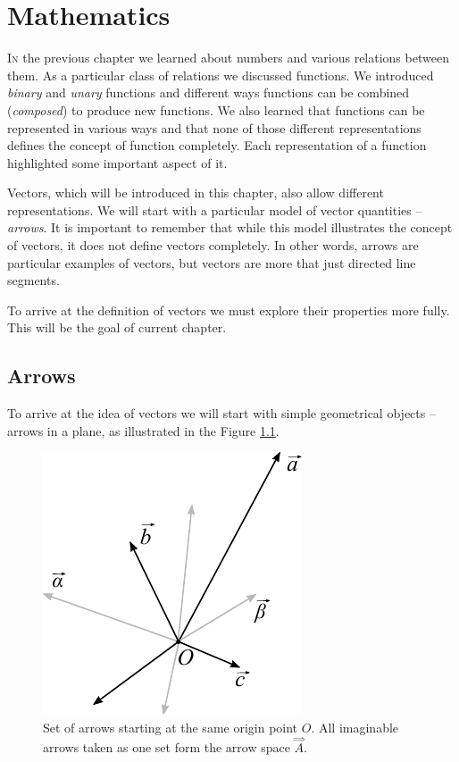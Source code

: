 \graphicspath{{../03Mathematics/pics/}}

\chapter{Mathematics}\label{ch:Mathematics}

\lettrine[lines=2]{\color{darkocre}I}{n} the previous chapter we
learned about numbers and various relations between them. As a
particular class of relations we discussed functions. We introduced
\emph{binary} and \emph{unary} functions and different ways
functions can be combined (\emph{composed}) to produce new
functions. We also learned
that functions can be
represented in various ways and that none of those different
representations defines
the concept of function completely. Each representation of a function
highlighted some important aspect of it.

Vectors, which will be introduced in this chapter, also allow
different representations. We will start with a particular model of
vector quantities --
\emph{arrows}. It is important to
remember that while this model illustrates the concept of vectors, it
does not define vectors completely. In other words, arrows are
particular examples of vectors, but vectors are more that just
directed line segments.

To arrive at the definition of vectors we must
explore their properties more fully. This will be the goal of current
chapter.

\section{Arrows}

To arrive at the idea of vectors we will start with simple geometrical
objects -- arrows in a plane, as illustrated in the Figure \ref{fig:arrowsSpace}.

\begin{figure}%
  \includegraphics[scale=1.0]{arrowsSpace}
  \caption{Set of arrows starting at the same origin point $O$. All
    imaginable arrows taken as one set form the arrow space
    $\overset{\Rightarrow}{A}$.}
  \label{fig:arrowsSpace}
\end{figure}

